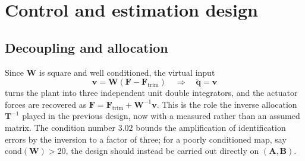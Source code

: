 \documentclass[]{IAC_style}
\newcommand{\W}{\bm{W}}
\newcommand{\Amat}{\bm{A}}
\newcommand{\Bmat}{\bm{B}}
\newcommand{\qv}{\bm{q}}
\newcommand{\Fv}{\bm{F}}
\begin{document}
\section{Control and estimation design}
\label{sec:control}

\subsection{Decoupling and allocation}
Since $\W$ is square and well conditioned, the virtual input
\begin{equation}
\bm{v}=\W(\Fv-\Fv_\mathrm{trim})\quad\Longrightarrow\quad\ddot{\qv}=\bm{v}
\label{eq:virtual}
\end{equation}
turns the plant into three independent unit double integrators, and the actuator forces are recovered as $\Fv=\Fv_\mathrm{trim}+\W^{-1}\bm{v}$. This is the role the inverse allocation $\bm{T}^{-1}$ played in the previous design, now with a measured rather than an assumed matrix. The condition number $3.02$ bounds the amplification of identification errors by the inversion to a factor of three; for a poorly conditioned map, say $\mathrm{cond}(\W)>20$, the design should instead be carried out directly on $(\Amat,\Bmat)$.
\end{document}
